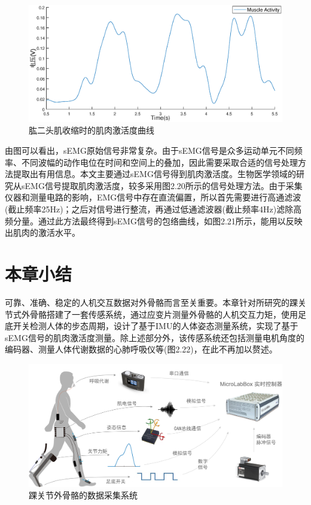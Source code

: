 \begin{figure}[!htb]
    \includegraphics[width=17cm]{fig/f46.eps}
    \caption{肱二头肌收缩时的肌肉激活度曲线}
    \label{fig:mark}
\end{figure}

由图可以看出，sEMG原始信号非常复杂。由于sEMG信号是众多运动单元不同频率、不同波幅的动作电位在时间和空间上的叠加，因此需要采取合适的信号处理方法提取出有用信息。本文主要通过sEMG信号得到肌肉激活度。生物医学领域的研究从sEMG信号提取肌肉激活度\cite{p45}，较多采用图2.20所示的信号处理方法。由于采集仪器和测量电路的影响，EMG信号中存在直流偏置，所以首先需要进行高通滤波(截止频率25Hz)；之后对信号进行整流，再通过低通滤波器(截止频率4Hz)滤除高频分量。通过此方法最终得到sEMG信号的包络曲线，如图2.21所示，能用以反映出肌肉的激活水平。

\section{本章小结}
可靠、准确、稳定的人机交互数据对外骨骼而言至关重要。本章针对所研究的踝关节式外骨骼搭建了一套传感系统，通过应变片测量外骨骼的人机交互力矩，使用足底开关检测人体的步态周期，设计了基于IMU的人体姿态测量系统，实现了基于sEMG信号的肌肉激活度测量。除上述部分外，该传感系统还包括测量电机角度的编码器、测量人体代谢数据的心肺呼吸仪等(图2.22)，在此不再加以赘述。

\begin{figure}[htb]
    \includegraphics[width=17cm]{fig/f27.png}
    \caption{踝关节外骨骼的数据采集系统}
    \label{fig:mark}
\end{figure}